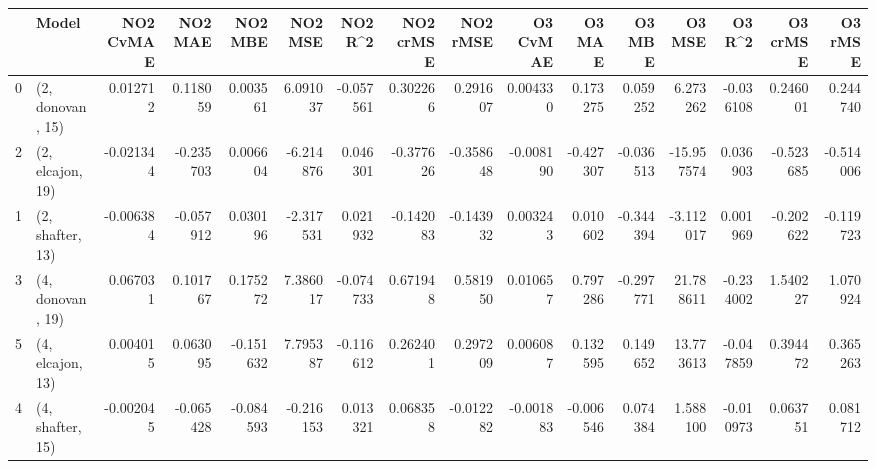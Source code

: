 \begin{tabular}{llrrrrrrrrrrrrrr}
\toprule
{} &             Model &  NO2 CvMAE &   NO2 MAE &   NO2 MBE &   NO2 MSE &   NO2 R\textasciicircum2 &  NO2 crMSE &  NO2 rMSE &  O3 CvMAE &    O3 MAE &    O3 MBE &     O3 MSE &    O3 R\textasciicircum2 &  O3 crMSE &   O3 rMSE \\
\midrule
0 &  (2, donovan, 15) &   0.012712 &  0.118059 &  0.003561 &  6.091037 & -0.057561 &   0.302266 &  0.291607 &  0.004330 &  0.173275 &  0.059252 &   6.273262 & -0.036108 &  0.246001 &  0.244740 \\
2 &  (2, elcajon, 19) &  -0.021344 & -0.235703 &  0.006604 & -6.214876 &  0.046301 &  -0.377626 & -0.358648 & -0.008190 & -0.427307 & -0.036513 & -15.957574 &  0.036903 & -0.523685 & -0.514006 \\
1 &  (2, shafter, 13) &  -0.006384 & -0.057912 &  0.030196 & -2.317531 &  0.021932 &  -0.142083 & -0.143932 &  0.003243 &  0.010602 & -0.344394 &  -3.112017 &  0.001969 & -0.202622 & -0.119723 \\
3 &  (4, donovan, 19) &   0.067031 &  0.101767 &  0.175272 &  7.386017 & -0.074733 &   0.671948 &  0.581950 &  0.010657 &  0.797286 & -0.297771 &  21.788611 & -0.234002 &  1.540227 &  1.070924 \\
5 &  (4, elcajon, 13) &   0.004015 &  0.063095 & -0.151632 &  7.795387 & -0.116612 &   0.262401 &  0.297209 &  0.006087 &  0.132595 &  0.149652 &  13.773613 & -0.047859 &  0.394472 &  0.365263 \\
4 &  (4, shafter, 15) &  -0.002045 & -0.065428 & -0.084593 & -0.216153 &  0.013321 &   0.068358 & -0.012282 & -0.001883 & -0.006546 &  0.074384 &   1.588100 & -0.010973 &  0.063751 &  0.081712 \\
\bottomrule
\end{tabular}
